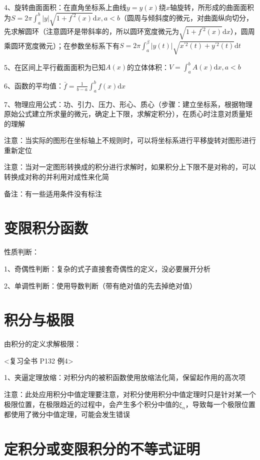 4、旋转曲面面积：在直角坐标系上曲线$y=y(x)$绕$x$轴旋转，所形成的曲面面积为$S=2 \pi \int_{a}^{b}|y| \sqrt{1+f^{\prime 2}(x)} \mathrm{d} x, a<b$（圆周与倾斜度的微元，对曲面纵向切分，先求解圆环（注意圆环是带斜率的，所以圆环宽度微元为$\sqrt{1+f^{\prime 2}(x)} \mathrm{d} x$），圆周乘圆环宽度微元）；在参数坐标系下有$S=2 \pi \int_{a}^{\beta}|y(t)| \sqrt{x^{\prime 2}(t)+y^{\prime 2}(t)} \mathrm{d} t$

5、在区间上平行截面面积为已知$A(x)$的立体体积：$V=\int_{a}^{b} A(x) \mathrm{d} x, a<b$

6、函数的平均值：$\bar{f}=\frac{1}{b-a} \int_{a}^{b} f(x) \mathrm{d} x$

7、物理应用公式：功、引力、压力、形心、质心（步骤：建立坐标系，根据物理原始公式建立所求量的微元，确定上下限，求解定积分），在质心时注意对质量矩的理解

注意：当实际的图形在坐标轴上不规则时，可以将坐标系进行平移旋转对图形进行重新定位

注意：当对一定图形转换成的积分进行求解时，如果积分上下限不是对称的，可以转换成对称的并利用对成性来化简

备注：有一些适用条件没有标注

\section{变限积分函数}

性质判断：

1、奇偶性判断：复杂的式子直接套奇偶性的定义，没必要展开分析

2、单调性判断：使用导数判断（带有绝对值的先去掉绝对值）

\section{积分与极限}

由积分的定义求解极限：

<复习全书 P132 例4>

1、夹逼定理放缩：对积分内的被积函数使用放缩法化简，保留起作用的高次项

注意：此处应用积分中值定理要注意，对积分使用积分中值定理时只是针对某一个极限位置，在极限趋近的过程中，会产生多个积分中值的$\xi_n$，导致每一个极限位置都使用了微分中值定理，可能会发生错误

\section{定积分或变限积分的不等式证明}

